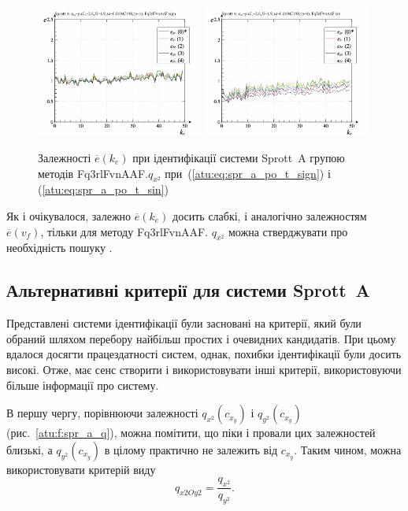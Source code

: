 \begin{figure}[htb!]
  \centerline{
    \includegraphics[width=0.49\textwidth]{p/cha/spr_a/Fq3rlFvnAAF_x2/sprott_a_id-p_k_e_sign.png}
    \hfill
    \includegraphics[width=0.49\textwidth]{p/cha/spr_a/Fq3rlFvnAAF_x2/sprott_a_id-p_k_e_sin.png}
  }
\caption{Залежності $ \overline{e} (k_e) $ при ідентифікації системи Sprott~A групою методів Fq3rlFvnAAF.$q_{x^2} $ при~(\ref{atu:eq:spr_a_po_t_sign}) і (\ref{atu:eq:spr_a_po_t_sin})}
  \label{atu:f:spr_a_k_e_Fq3rlFvnAAF_q_x2}
\end{figure}

Як і очікувалося, залежно
$ \overline{e} (k_e) $ досить слабкі, і аналогічно залежностям
$ \overline{e} (v_f) $, тільки для методу Fq3rlFvnAAF.
$ q_{x^2} $ можна стверджувати про необхідність пошуку .


\subsection{Альтернативні критерії для системи Sprott~A}%

Представлені системи ідентифікації були засновані на критерії,
який були обраний шляхом перебору найбільш простих і очевидних
кандидатів. При цьому вдалося досягти працездатності систем,
однак, похибки ідентифікації були досить високі. Отже, має
сенс створити і використовувати інші критерії, використовуючи
більше інформації про систему.

В першу чергу, порівнюючи залежності
$ q_{x^2} (c_{x_y}) $ і
$ q_{y^2} (c_{x_y}) $ (рис.~\ref{atu:f:spr_a_q}), можна помітити, що піки і провали
цих залежностей близькі, а
$ q_{y^2} (c_{x_y}) $ в цілому практично не залежить від
$ c_{x_y} $. Таким чином, можна використовувати критерій виду
%
\[
  q_{x2Oy2} = \frac{q_{x^2}}{q_{y^2}}.
\]

